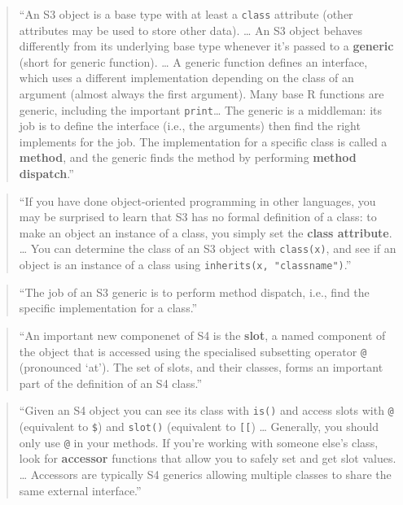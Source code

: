 \documentclass[]{tufte-book}
\begin{document}
\begin{quote}
``An S3 object is a base type with at least a \texttt{class} attribute (other attributes
may be used to store other data). \ldots{} An S3 object behaves differently from its
underlying base type whenever it's passed to a \textbf{generic} (short for generic
function). \ldots{} A generic function defines an interface, which uses a different
implementation depending on the class of an argument (almost always the first
argument). Many base R functions are generic, including the important \texttt{print}\ldots{}
The generic is a middleman: its job is to define the interface (i.e., the arguments)
then find the right implements for the job. The implementation for a specific class
is called a \textbf{method}, and the generic finds the method by performing \textbf{method
dispatch}.'' \citep{wickham2019advanced}
\end{quote}

\begin{quote}
``If you have done object-oriented programming in other languages, you may be
surprised to learn that S3 has no formal definition of a class: to make an object
an instance of a class, you simply set the \textbf{class attribute}. \ldots{} You can determine
the class of an S3 object with \texttt{class(x)}, and see if an object is an instance of
a class using \texttt{inherits(x,\ "classname")}.'' \citep{wickham2019advanced}
\end{quote}

\begin{quote}
``The job of an S3 generic is to perform method dispatch, i.e., find the specific
implementation for a class.'' \citep{wickham2019advanced}
\end{quote}

\begin{quote}
``An important new componenet of S4 is the \textbf{slot}, a named component of the
object that is accessed using the specialised subsetting operator \texttt{@} (pronounced
`at'). The set of slots, and their classes, forms an important part of the
definition of an S4 class.'' \citep{wickham2019advanced}
\end{quote}

\begin{quote}
``Given an S4 object you can see its class with \texttt{is()} and access slots with \texttt{@}
(equivalent to \texttt{\$}) and \texttt{slot()} (equivalent to \texttt{{[}{[}}) \ldots{} Generally, you should only
use \texttt{@} in your methods. If you're working with someone else's class, look for
\textbf{accessor} functions that allow you to safely set and get slot values. \ldots{} Accessors
are typically S4 generics allowing multiple classes to share the same external
interface.'' \citep{wickham2019advanced}
\end{quote}
\end{document}
